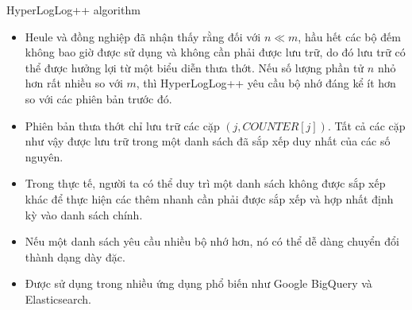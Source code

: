 \documentclass[10pt]{beamer}
\begin{document}
\begin{frame}{HyperLogLog++ algorithm}
  \begin{itemize}
    \item Heule và đồng nghiệp đã nhận thấy rằng đối với $n \ll m$, hầu hết các bộ đếm 
    không bao giờ được sử dụng và không cần phải được lưu trữ, do đó lưu trữ có thể được hưởng lợi 
    từ một biểu diễn thưa thớt. Nếu số lượng phần tử $n$ nhỏ hơn rất nhiều 
    so với $m$, thì HyperLogLog++ yêu cầu bộ nhớ đáng kể ít hơn so với các phiên bản 
    trước đó.
    \item Phiên bản thưa thớt chỉ lưu trữ các cặp $(j, COUNTER[j])$. Tất cả các cặp 
    như vậy được lưu trữ trong một danh sách đã sắp xếp duy nhất của các số nguyên. 
    \item Trong thực tế, người ta có thể duy trì một 
    danh sách không được sắp xếp khác để thực hiện các thêm nhanh 
    cần phải được sắp xếp và hợp nhất định kỳ vào danh sách chính. 
    \item Nếu một danh sách yêu cầu nhiều bộ nhớ hơn, nó có thể dễ dàng chuyển đổi 
    thành dạng dày đặc. 
    \item Được sử dụng trong nhiều ứng dụng phổ biến như Google BigQuery và Elasticsearch.
  \end{itemize}
  
  

\end{frame}
\end{document}
